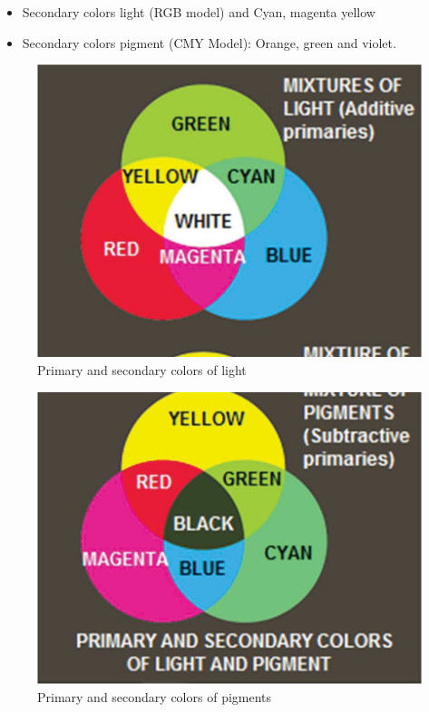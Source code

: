 \begin{itemize}
	\item Secondary colors light (RGB model) and Cyan, magenta yellow
	\item  Secondary colors pigment (CMY Model): Orange, green and violet.
\end{itemize}

\begin{figure}
  \includegraphics[width=\linewidth]{images/ch2/mixtureLight.jpg}
  \caption{Primary and secondary colors of light}
  \label{fig:mixtureLight}
\end{figure}

\begin{figure}
  \includegraphics[width=\linewidth]{images/ch2/mixturepigment.jpg}
  \caption{Primary and secondary colors of pigments}
  \label{fig:mixturepigment}
\end{figure}


